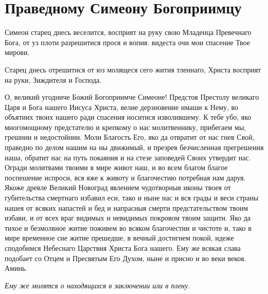 \section{Праведному Симеону Богоприимцу}\begin{mymulticols}



Симеон старец днесь веселится, восприят на руку свою Младенца Превечнаго Бога, от уз плоти разрешитися прося и вопия: видеста очи мои спасение Твое мирови.




Старец днесь отрешитися от юз молящеся сего жития тленнаго, Христа восприят на руки, Зиждителя и Господа.



О, великий угодниче Божий Богоприимче Симеоне! Предстоя Престолу великаго Царя и Бога нашего Иисуса Христа, велие дерзновение имаши к Нему, во объятиих твоих нашего ради спасения носитися изволившему. К тебе убо, яко многомощному предстателю и крепкому о нас молитвеннику, прибегаем мы, грешнии и недостойнии. Моли Благость Его, яко да отвратит от нас гнев Свой, праведно по делом нашим на ны движимый, и презрев безчисленная прегрешения наша, обратит нас на путь покаяния и на стезе заповедей Своих утвердит нас. Огради молитвами твоими в мире живот наш, и во всем благом благое поспешение испроси, вся яже к животу и благочестию потребная нам даруя. Якоже древле Великий Новоград явлением чудотворныя иконы твоея от губительства смертнаго избавил еси, тако и ныне нас и вся грады и веси страны нашея от всяких напастей и бед и напрасныя смерти предстательством твоим избави, и от всех враг видимых и невидимых покровом твоим защити. Яко да тихое и безмолвное житие поживем во всяком благочестии и чистоте и, тако в мире временное сие житие прешедше, в вечный достигнем покой, идеже сподобимся Небеснаго Царствия Христа Бога нашего. Ему же всякая слава подобает со Отцем и Пресвятым Его Духом, ныне и присно и во веки веков. Аминь.

\itshape Ему же молятся о находящихся в заключении или в плену.\normalfont{}


\end{mymulticols}

\mychapterending





